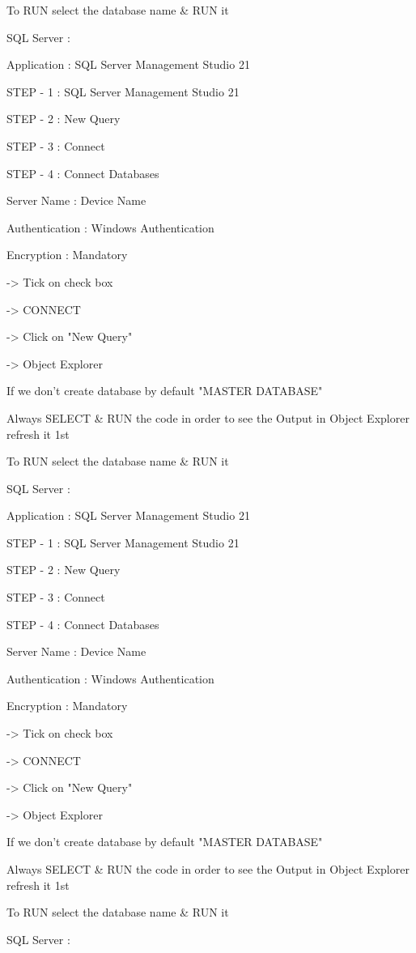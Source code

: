 To RUN select the database name & RUN it

SQL Server :

Application : SQL Server Management Studio 21

STEP - 1 : SQL Server Management Studio 21

STEP - 2 : New Query

STEP - 3 : Connect

STEP - 4 : Connect Databases


Server Name : Device Name

Authentication : Windows Authentication

Encryption : Mandatory

-> Tick on check box

-> CONNECT

-> Click on "New Query"

-> Object Explorer


If we don't create database by default "MASTER DATABASE"


Always SELECT & RUN the code in order to see the Output in Object Explorer refresh it 1st


To RUN select the database name & RUN it

SQL Server :

Application : SQL Server Management Studio 21

STEP - 1 : SQL Server Management Studio 21

STEP - 2 : New Query

STEP - 3 : Connect

STEP - 4 : Connect Databases


Server Name : Device Name

Authentication : Windows Authentication

Encryption : Mandatory

-> Tick on check box

-> CONNECT

-> Click on "New Query"

-> Object Explorer


If we don't create database by default "MASTER DATABASE"


Always SELECT & RUN the code in order to see the Output in Object Explorer refresh it 1st


To RUN select the database name & RUN it

SQL Server :

